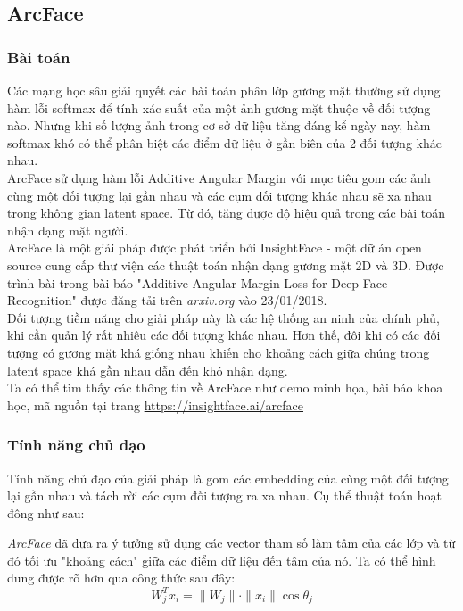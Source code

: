 \subsection{ArcFace}
\subsubsection{Bài toán}
Các mạng học sâu giải quyết các bài toán phân lớp gương mặt thường sử dụng hàm lỗi softmax để tính xác suất của một ảnh gương mặt thuộc về đối tượng nào. Nhưng khi số lượng ảnh trong cơ sở dữ liệu tăng đáng kể ngày nay, hàm softmax khó có thể phân biệt các điểm dữ liệu ở gần biên của 2 đối tượng khác nhau.\\
ArcFace sử dụng hàm lỗi Additive Angular Margin với mục tiêu gom các ảnh cùng một đối tượng lại gần nhau và các cụm đối tượng khác nhau sẽ xa nhau trong không gian latent space. Từ đó, tăng được độ hiệu quả trong các bài toán nhận dạng mặt người.\\
ArcFace là một giải pháp được phát triển bởi InsightFace - một dữ án open source cung cấp thư viện các thuật toán nhận dạng gương mặt 2D và 3D. Được trình bài trong bài báo "Additive Angular Margin Loss for Deep Face Recognition" được đăng tải trên \textit{arxiv.org} vào 23/01/2018.\\
Đối tượng tiềm năng cho giải pháp này là các hệ thống an ninh của chính phủ, khi cần quản lý rất nhiêu các đối tượng khác nhau. Hơn thế, đôi khi có các đối tượng có gương mặt khá giống nhau khiến cho khoảng cách giữa chúng trong latent space khá gần nhau dẫn đến khó nhận dạng.\\
Ta có thể tìm thấy các thông tin về ArcFace như demo minh họa, bài báo khoa học, mã nguồn tại trang \url{https://insightface.ai/arcface}
\subsubsection{Tính năng chủ đạo}
Tính năng chủ đạo của giải pháp là gom các embedding của cùng một đối tượng lại gần nhau và tách rời các cụm đối tượng ra xa nhau. Cụ thể thuật toán hoạt đông như sau:

\textit{ArcFace} đã đưa ra ý tưởng sử dụng các vector tham số làm tâm của các lớp và từ đó tối ưu "khoảng cách" giữa các điểm dữ liệu đến tâm của nó. Ta có thể hình dung được rõ hơn qua công thức sau đây:
\begin{equation}
    W_{j}^{T}x_i = \|W_j\|\cdot\|x_i\|\cos{\theta_j}
\end{equation}

